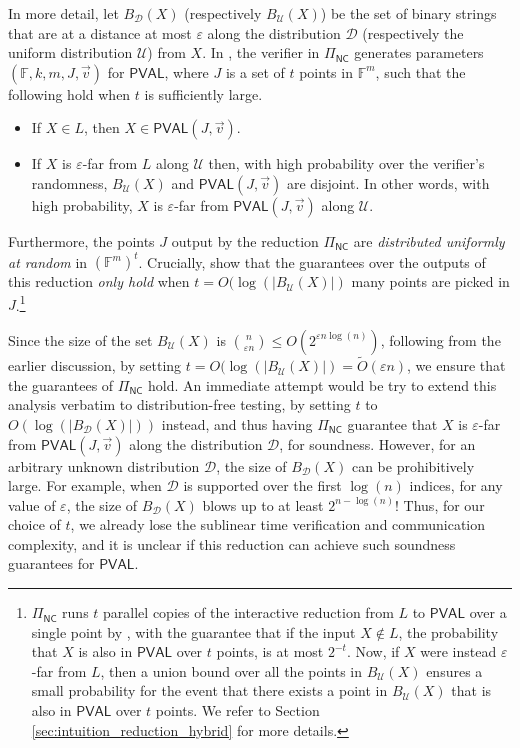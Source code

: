 \documentclass[11pt]{article}
\newcommand{\NC}{\mathsf{NC}}
\newcommand{\PVAL}{\mathsf{PVAL}}
\newcommand{\F}{\mathbb{F}}
\newcommand{\sU}{\mathcal{U}}
\newcommand{\sD}{\mathcal{D}}
\newcommand{\eps}{\varepsilon}
\begin{document}
In more detail, let $B_\sD(X)$ (respectively $B_\sU(X)$) be the set of binary strings that are at a distance at most $\eps$ along the distribution $\sD$ (respectively the uniform distribution $\sU$) from $X$. In \cite{RVW}, the verifier in $\Pi_\NC$ generates parameters $(\F,k,m,J,\Vec{v})$ for $\PVAL$, where $J$ is a set of $t$ points in $\F^m$, such that the following hold when $t$ is sufficiently large.
\begin{itemize}
    \item If $X \in L$, then $X \in \PVAL(J,\Vec{v})$.
    \item If $X$ is $\varepsilon$-far from $L$ along $\sU$ then, with high probability over the verifier's randomness, $B_\sU(X)$ and $\PVAL(J,\Vec{v})$ are disjoint. In other words, with high probability, $X$ is $\varepsilon$-far from $\PVAL(J,\Vec{v})$ along $\sU$.
\end{itemize}
Furthermore, the points $J$ output by the reduction $\Pi_\NC$ are \textit{distributed uniformly at random} in $\left( \F^m \right)^t$. Crucially, \cite{RVW} show that the guarantees over the outputs of this reduction \textit{only hold} when $t = O(\log (\vert B_\sU(X) \vert)$ many points are picked in $J$.\footnote{\label{fn:gkr} $\Pi_\NC$ runs $t$ parallel copies of the interactive reduction from $L$ to $\PVAL$ over a single point by \cite{GKR15}, with the guarantee that if the input $X \notin L$, the probability that $X$ is also in $\PVAL$ over $t$ points, is at most $2^{-t}$. Now, if $X$ were instead $\varepsilon$-far from $L$, then a union bound over all the points in $B_\sU(X)$ ensures a small probability for the event that there exists a point in $B_\sU(X)$ that is also in $\PVAL$ over $t$ points. We refer to Section \ref{sec:intuition_reduction_hybrid} for more details.}

Since the size of the set $B_\sU (X)$ is $\binom{n}{\varepsilon n} \leq O(2^{\varepsilon n \log(n)})$, following from the earlier discussion, by setting $t = O(\log (\vert B_\sU(X) \vert) = \tilde{O}(\varepsilon n)$, we ensure that the guarantees of $\Pi_\NC$ hold. An immediate attempt would be try to extend this analysis verbatim to distribution-free testing, by setting $t$ to $O(\log (\vert B_\sD(X) \vert))$ instead, and thus having $\Pi_\NC$ guarantee that $X$ is $\varepsilon$-far from $\PVAL(J,\Vec{v})$ along the distribution $\sD$, for soundness. However, for an arbitrary unknown distribution $\sD$, the size of $B_{\sD}(X)$ can be prohibitively large. For example, when $\sD$ is supported over the first $\log(n)$ indices, for any value of $\varepsilon$, the size of $B_\sD (X)$ blows up to at least $2^{n-\log(n)}$! Thus, for our choice of $t$, we already lose the sublinear time verification and communication complexity, and it is unclear if this reduction can achieve such soundness guarantees for $\PVAL$. 
\end{document}
